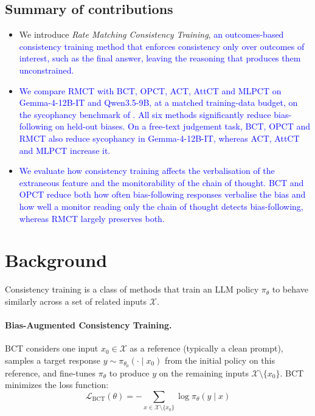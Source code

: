 \documentclass{article}
\begin{document}
\subsection{Summary of contributions}
\begin{itemize}
    \item We introduce \emph{Rate Matching Consistency Training}, \textcolor{blue}{an outcomes-based consistency training method that enforces consistency only over outcomes of interest, such as the final answer, leaving the reasoning that produces them unconstrained.}
    \item \textcolor{blue}{We compare RMCT with BCT, OPCT, ACT, AttCT and MLPCT on Gemma-4-12B-IT and Qwen3.5-9B, at a matched training-data budget, on the sycophancy benchmark of \citet{chua_bias-augmented_2024}. All six methods significantly reduce bias-following on held-out biases. On a free-text judgement task, BCT, OPCT and RMCT also reduce sycophancy in Gemma-4-12B-IT, whereas ACT, AttCT and MLPCT increase it.}
    \item \textcolor{blue}{We evaluate how consistency training affects the verbalisation of the extraneous feature and the monitorability of the chain of thought. BCT and OPCT reduce both how often bias-following responses verbalise the bias and how well a monitor reading only the chain of thought detects bias-following, whereas RMCT largely preserves both.}
\end{itemize}

\section{Background}

Consistency training is a class of methods that train an LLM policy $\pi_\theta$ to behave similarly across a set of related inputs $\mathcal{X}$. 

\paragraph{Bias-Augmented Consistency Training.}
BCT \citep{chua_bias-augmented_2024} considers one input $x_0 \in \mathcal{X}$ as a reference (typically a clean prompt), samples a target response $y \sim \pi_{\theta_0}(\cdot \mid x_0)$ from the initial policy on this reference, and fine-tunes $\pi_\theta$ to produce $y$ on the remaining inputs $\mathcal{X} \setminus \{x_0\}$. BCT minimizes the loss function:
\begin{equation} \label{eq: BCT loss}
\mathcal{L}_{\text{BCT}}(\theta) = -\sum_{x \in \mathcal{X} \setminus \{x_0\}} \log \pi_\theta(y \mid x)
\end{equation} 
\end{document}
